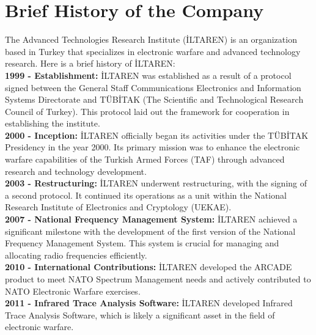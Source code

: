 \documentclass[12pt]{report}
\begin{document}
    \section{Brief History of the Company}
    The Advanced Technologies Research Institute (İLTAREN) is an organization based in Turkey that specializes in electronic warfare and advanced technology research. Here is a brief history of İLTAREN:
        \\ \newline
        \textbf{1999 - Establishment:} İLTAREN was established as a result of a protocol signed between the General Staff Communications Electronics and Information Systems Directorate and TÜBİTAK (The Scientific and Technological Research Council of Turkey). This protocol laid out the framework for cooperation in establishing the institute.
        \\ \newline
        \textbf{2000 - Inception:} İLTAREN officially began its activities under the TÜBİTAK Presidency in the year 2000. Its primary mission was to enhance the electronic warfare capabilities of the Turkish Armed Forces (TAF) through advanced research and technology development.
        \\ \newline    
        \textbf{2003 - Restructuring:} İLTAREN underwent restructuring, with the signing of a second protocol. It continued its operations as a unit within the National Research Institute of Electronics and Cryptology (UEKAE).
        \\ \newline
        \textbf{2007 - National Frequency Management System:} İLTAREN achieved a significant milestone with the development of the first version of the National Frequency Management System. This system is crucial for managing and allocating radio frequencies efficiently.
        \\ \newline
        \textbf{2010 - International Contributions:} İLTAREN developed the ARCADE product to meet NATO Spectrum Management needs and actively contributed to NATO Electronic Warfare exercises.
        \\ \newline
        \textbf{2011 - Infrared Trace Analysis Software:} İLTAREN developed Infrared Trace Analysis Software, which is likely a significant asset in the field of electronic warfare.
        \\ \newline
\end{document}

